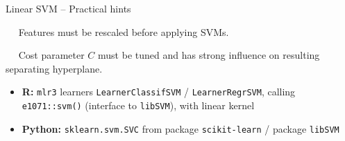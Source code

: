 \begin{frame}{Linear SVM -- Practical hints}

\footnotesize

   ~~
  Features must be rescaled before applying SVMs.
  
  \medskip
  
   ~~
  Cost parameter $C$ must be tuned and has strong influence on resulting 
  separating hyperplane. 

  \medskip

  \begin{itemize}
    \item \textbf{R:} \texttt{mlr3} learners \texttt{LearnerClassifSVM} /
    \texttt{LearnerRegrSVM}, calling \texttt{e1071::svm()} (interface to 
    \texttt{libSVM}), with linear kernel
    \item \textbf{Python:} \texttt{sklearn.svm.SVC} from package 
    \texttt{scikit-learn} / package \texttt{libSVM}
  \end{itemize}

\end{frame}
